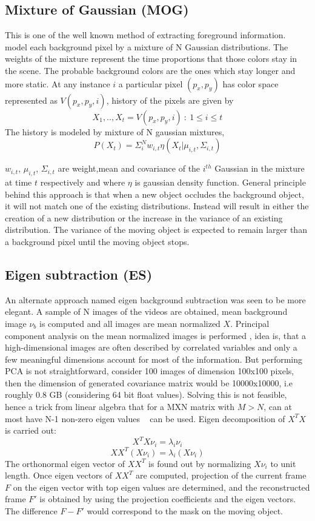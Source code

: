 \subsection{Mixture of Gaussian (MOG)}
This is one of the well known method of extracting foreground information. \cite{kaew} model each background pixel by a mixture of N Gaussian distributions. The weights of the mixture represent the time proportions that those colors stay in the scene. The probable background colors are the ones which stay longer and more static. At any instance $i$ a particular pixel $(p_x,p_y)$ has color space represented as $V(p_{x},p_{y},i)$, history of the pixels are given by 
$$X_{1},..,X_{t} = {V(p_{x},p_{y},i)~:~1\le i \le t }$$
The history is modeled by mixture of N gaussian mixtures,
$$P(X_{t})=\Sigma_{i}^{N}w_{i,t}\eta(X_{t}|\mu_{i,t},\Sigma_{i,t})$$
\par $w_{i,t}$, $\mu_{i,t}$, $\Sigma_{i,t}$ are weight,mean and covariance of the $i^{th}$ Gaussian in the mixture at time $t$ respectively and where $\eta$ is gaussian density function. General principle behind this approach is that when a new object occludes the background object, it will not match one of the existing distributions. Instead will result in either the creation of a new distribution or the increase in the variance of an existing distribution. The variance of the moving object is expected to remain larger than a background pixel until the moving object stops.


\subsection{Eigen subtraction (ES)}
An alternate approach named eigen background subtraction was seen to be more elegant. A sample of N images of the videos are obtained, mean background image $\nu_b$ is computed and all images are mean normalized  $X$. Principal component analysis on the mean normalized images is performed , idea is, that a high-dimensional images are often described by correlated variables and only a few meaningful dimensions account for most of the information. But performing PCA is not straightforward, consider 100 images of dimension 100x100 pixels, then the dimension of generated covariance matrix would be 10000x10000, i.e roughly 0.8 GB (considering 64 bit float values). Solving this is not feasible, hence a trick from linear algebra that for a MXN matrix with $M>N$, can at most have N-1 non-zero eigen values ~\cite{Duda01} can be used. Eigen decomposition of $X^TX$ is carried out:
$$X^TX\nu_i=\lambda_i\nu_i$$
$$XX^T(X\nu_i)=\lambda_i(X\nu_i)$$
The orthonormal eigen vector of $XX^T$ is found out by normalizing $X\nu_i$ to unit length. Once eigen vectors of $XX^T$  are computed, projection of the current frame $F$ on the eigen vector with top eigen values are determined, and the reconstructed frame $F'$ is obtained by using the projection coefficients and the eigen vectors. The difference $F-F'$ would correspond to the mask on the moving object. 

